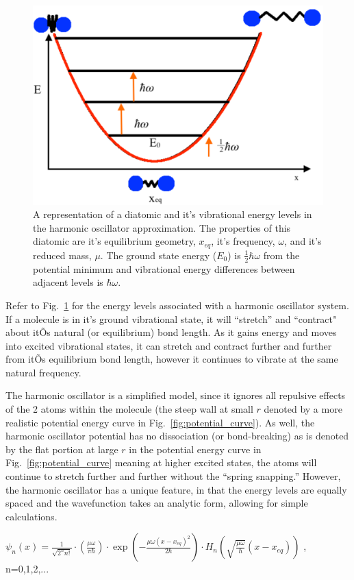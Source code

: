 \documentclass[12pt]{article}
\begin{document}
\begin{figure}
    \begin{center}
        \includegraphics[width=0.4\linewidth]{figures/Harmonic_Oscillator.pdf}
    \end{center}
    \caption{
    A representation of a diatomic and it's vibrational energy levels in the harmonic oscillator approximation. The properties of this diatomic are it's equilibrium geometry, $x_{eq}$, it's frequency, $\omega$, and it's reduced mass, $\mu$. The ground state energy ($E_0$) is $\frac{1}{2}\hbar\omega$ from the potential minimum and vibrational energy differences between adjacent levels is $\hbar\omega$.
    }
    \label{fig:harmonic_curve}
\end{figure}

Refer to Fig.~\ref{fig:harmonic_curve} for the energy levels associated with a harmonic oscillator system. If a molecule is in it's ground vibrational state, it will ``stretch'' and ``contract" about itÕs natural (or equilibrium) bond length. As it gains energy and moves into excited vibrational states, it can stretch and contract further and further from itÕs equilibrium bond length, however it continues to vibrate at the same natural frequency.

The harmonic oscillator is a simplified model, since it ignores all repulsive effects of the 2 atoms within the molecule (the steep wall at small $r$ denoted by a more realistic potential energy curve in Fig.~\ref{fig:potential_curve}). As well, the harmonic oscillator potential has no dissociation (or bond-breaking) as is denoted by the flat portion at large $r$ in the potential energy curve in Fig.~\ref{fig:potential_curve} meaning at higher excited states, the atoms will continue to stretch further and further without the ``spring snapping.''
\newpage
However, the harmonic oscillator has a unique feature, in that the energy levels are equally spaced and the wavefunction takes an analytic form, allowing for simple calculations.

$\psi_n(x) = \frac{1}{\sqrt{2^nn!}}\cdot\left(\frac{\mu\omega}{\pi\hbar}\right)\cdot\exp\left(-\frac{\mu\omega (x-x_{eq})^2}{2\hbar}\right)\cdot H_n\left(\sqrt{\frac{\mu\omega}{\hbar}}(x-x_{eq})\right)$ , n=0,1,2,...
\end{document}
